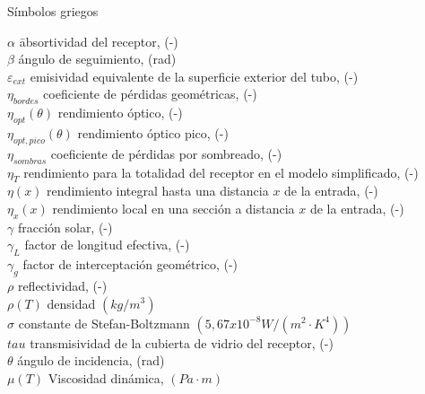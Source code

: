 Símbolos griegos

\begin{tabbing}
$\alpha$ \quad\quad\quad\quad\quad\quad\= absortividad del receptor, (-) \\
$\beta$ \> ángulo de seguimiento, (rad) \\
$\varepsilon_{ext}$ \> emisividad equivalente de la superficie exterior del tubo, (-) \\
$\eta_{bordes}$ \> coeficiente de pérdidas geométricas, (-)  \\
$\eta_{opt}(\theta)$  \> rendimiento óptico, (-)  \\
$\eta_{opt,pico}(\theta)$  \> rendimiento óptico pico, (-)  \\
$\eta_{sombras}$ \> coeficiente de pérdidas por sombreado, (-)  \\
$\eta_{T}$ \> rendimiento para la totalidad del receptor en el modelo simplificado, (-)  \\
$\eta(x)$ \> rendimiento integral hasta una distancia $x$ de la entrada, (-)  \\
$\eta_x(x)$ \> rendimiento local en una sección a distancia $x$ de la entrada, (-) \\
$\gamma$ \> fracción solar, (-) \\
$\gamma_L$ \>  factor de longitud efectiva, (-)  \\
$\gamma_g$  \> factor de interceptación geométrico, (-)  \\
$\rho$ \> reflectividad, (-) \\
$\rho(T)$ \> densidad $(kg/m^3)$ \\
$\sigma$ \> constante de Stefan-Boltzmann $(5,67x10^{-8} W/(m^2 \cdot K^4))$\\
$tau$ \> transmisividad de la cubierta de vidrio del receptor, (-) \\
$\theta$ \> ángulo de incidencia, (rad) \\
$\mu(T)$ \> Viscosidad dinámica, $(Pa \cdot m)$ 
\end{tabbing}

